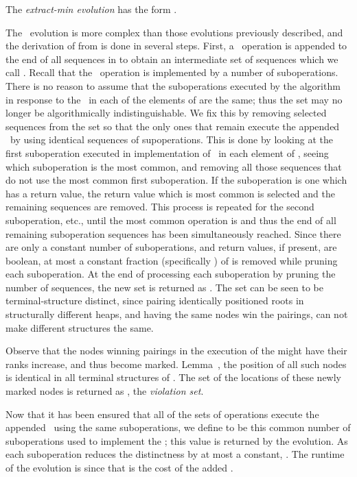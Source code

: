 The \emph{extract-min evolution} has the form .
\begin{fullonly}

\end{fullonly}
The \eEm\ evolution is more complex than those evolutions previously described, and the derivation of  from  is done in several steps. First, a \opEm\ operation is appended to the end of all sequences in  to obtain an intermediate set of sequences which we call . Recall that the \opEm\ operation is implemented by a number of suboperations. There is no reason to assume that the suboperations executed by the algorithm in response to the \opEm\ in each of the elements of  are the same; thus the set   may no longer be algorithmically indistinguishable. We fix this by removing selected sequences from the set  so that the only ones that remain execute the appended \opEm\ by using identical sequences of supoperations. This is done by looking at the first suboperation executed in implementation of \opEm\ in each element of , seeing which suboperation is the most common, and removing all those sequences   that do not use the most common first suboperation. If the suboperation is one which has a return value, the return value which is most common is selected and the remaining sequences are removed. This process is repeated for the second suboperation, etc., until the most common operation is  and thus the end of all remaining suboperation sequences has been simultaneously reached. Since there are only a constant  number of suboperations, and return values, if present, are boolean, at most a constant fraction (specifically ) of  is removed while pruning each suboperation. At the end of processing each suboperation by pruning the number of sequences, the new set is returned as . The set  can be seen to be terminal-structure distinct, since pairing identically positioned roots in structurally different heaps, and having the same nodes win the pairings, can not make different structures the same. 


Observe that the nodes winning pairings in the execution of the  might have their ranks increase, and thus become marked.  Lemma~, the position of all such nodes is identical in all terminal structures of . The set of the locations of these newly marked  nodes is returned as , the \emph{violation set}.

Now that it has been ensured that all of the sets of operations execute the appended \opEm\ using the same suboperations, we 
define  to be this common number of suboperations used to implement the \opEm; this value is returned by the evolution. As each suboperation reduces the distinctness by at most a constant,
. The runtime of the evolution is  since that is the cost of the added \opEm.


